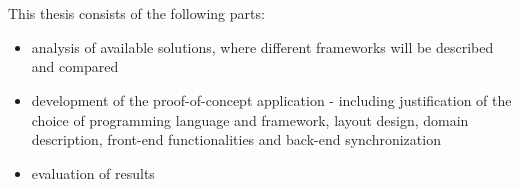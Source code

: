 \section{}%
\label{sec:opzet-graduaatsproef}







This thesis consists of the following parts:
\begin{itemize}
    \item  analysis of available solutions, where different frameworks will be described and compared
    \item  development of the proof-of-concept application - including justification of the choice of programming language and framework, layout design, domain description, front-end functionalities and back-end synchronization
    \item evaluation of results
\end{itemize}